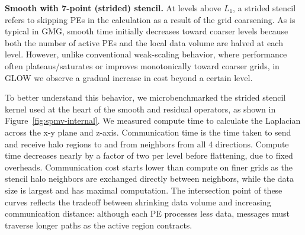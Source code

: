 \documentclass[sigconf]{acmart}
\begin{document}
\textbf{Smooth with 7-point (strided) stencil.}
At levels above $L_1$, a strided stencil refers to skipping PEs in the calculation as a result of the grid coarsening.  
As is typical in GMG, smooth time initially decreases toward coarser levels because both the number of active PEs and the local data volume are halved at each level. However, unlike conventional weak-scaling behavior, %
where performance often plateaus/saturates or improves monotonically toward coarser grids, in GLOW we observe a gradual increase in cost beyond a certain level. 
        
To better understand this behavior, we microbenchmarked the strided stencil kernel used 
at the heart of the smooth and residual operators, as 
shown in Figure~\ref{fig:spmv-internal}. We measured compute time to calculate the Laplacian across the x-y plane and z-axis. %
Communication time is the time taken to send and receive halo regions to and from neighbors from all 4 directions. Compute time decreases nearly by a factor of two per level before flattening, due to fixed overheads. Communication cost starts lower than compute on finer grids as the stencil halo neighbors are exchanged directly between neighbors, while the data size is largest and has maximal computation.
The intersection point of these curves reflects the tradeoff between shrinking data volume and increasing communication distance: although each PE processes less data, messages must traverse longer paths as the active region contracts.
\end{document}
